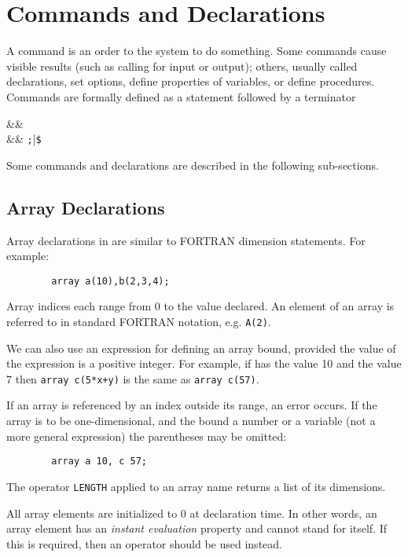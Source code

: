 \chapter{Commands and Declarations}

A command is an order to the system to do something.  Some
commands cause visible results (such as calling for input or output);
others, usually called declarations, set options,
define properties of variables, or define procedures.  Commands are
formally defined as a statement followed by a terminator
\begin{syntaxtable}
   &\bnfprod&   \\
   &\bnfprod& \texttt{;}|\texttt{\$}
\end{syntaxtable}
Some {\REDUCE} commands and declarations are described in the following
sub-sections.

\hypertarget{reserved:ARRAY}{\section{Array Declarations}}

Array declarations in {\REDUCE} are similar to FORTRAN
dimension statements.  For example:
\begin{verbatim}
        array a(10),b(2,3,4);
\end{verbatim}
Array indices each range from 0 to the value declared. An element of an
array is referred to in standard FORTRAN notation, e.g. \texttt{A(2)}.

We can also use an expression for defining an array bound, provided the
value of the expression is a positive integer. For example, if  has the
value 10 and  the value 7 then
\texttt{array c(5*x+y)} is the same as \texttt{array c(57)}.

If an array is referenced by an index outside its range, an error occurs.
If the array is to be one-dimensional, and the bound a number or a variable
(not a more general expression) the parentheses may be omitted:
\begin{verbatim}
        array a 10, c 57;
\end{verbatim}
The operator \texttt{LENGTH} applied to an array name
returns a list of its dimensions.

All array elements are initialized to 0 at declaration time. In other words,
an array element has an \emph{instant evaluation}
property and cannot stand for itself.  If this is required, then an
operator should be used instead.

